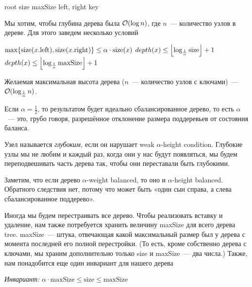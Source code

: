 \begin{algorithmic}[0]
	\algrenewcommand{}
		\State root
		\State size
		\State maxSize
	\EndProcedure
		\State left, right
		\State key
	\EndProcedure
\end{algorithmic}

Мы хотим, чтобы глубина дерева была $\BigO(\log n)$, где $n$~--- количество узлов в дереве. Для этого заведем несколько условий

\begin{algorithmic}[0]
	\algrenewcommand{}
		\State $\max \set*{\size (x.\text{left}), \size (x.\text{right})} \leq \alpha \cdot \size (x)$
	\EndProcedure
		\State $depth(x) \leq \floor*{\log_{\frac{1}{\alpha}} \text{size}} + 1$
	\EndProcedure
		\State $depth(x) \leq \floor*{\log_{\frac{1}{\alpha}} \text{maxSize}} + 1$ 
	\EndProcedure
\end{algorithmic}

Желаемая максимальная высота дерева ($n$~— количество узлов с ключами)~— $\BigO(\log_{\frac{1}{\alpha}} n)$.

Если $\alpha = \frac{1}{2}$, то результатом будет идеально сбалансированное дерево, то есть $\alpha$~--- это, грубо говоря, разрешённое отклонение размера поддеревьев от состояния баланса.

Узел называется {\it глубоким,} если он нарушает weak $\alpha$-height condition. Глубокие узлы мы не любим и каждый раз, когда они у нас будут появляться, мы будем переподвешивать часть дерева так, чтобы они переставали быть глубокими.

Заметим, что если дерево $\alpha$-weight balanced, то оно и $\alpha$-height balanced. Обратного следствия нет, потому что может быть «один сын справа, а слева сбалансированное поддерево».

Иногда мы будем перестраивать все дерево. Чтобы реализовать вставку и удаление, нам также потребуется хранить величину maxSize для всего дерева tree. maxSize~— штука, отвечающая какой максимальный размер был у дерева с момента последней его полной перестройки. (То есть, кроме собственно дерева с ключами, мы храним дополнительно только size и maxSize~--- два числа.) Также, нам понадобится еще один инвариант для нашего дерева

{\it Инвариант:} $\alpha \cdot \text{maxSize} \leq \text{size} \leq \text{maxSize}$

